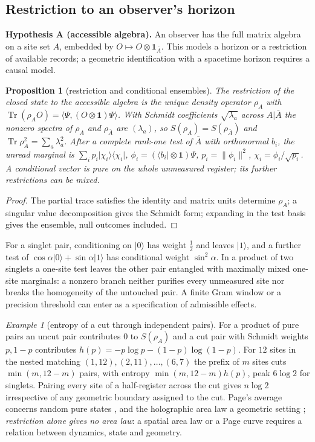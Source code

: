 \documentclass[aps,pra,onecolumn,superscriptaddress,nofootinbib,10pt]{revtex4-2}
\newtheorem{proposition}[theorem]{Proposition}
\theoremstyle{definition}
\theoremstyle{remark}
\newtheorem{example}[theorem]{Example}
\newcommand{\tr}{\operatorname{Tr}}
\newcommand{\ip}[2]{\langle #1,#2\rangle}
\begin{document}
\subsection{Restriction to an observer's horizon}\label{sec:cuhorizon}

\smallskip\noindent\textbf{Hypothesis A (accessible algebra).}\label{hyp:A}  An observer has the full matrix algebra on a site set $A$,
embedded by $O\mapsto O\otimes\mathbf1_{\bar A}$.  This models a horizon or a restriction of available records; a geometric
identification with a spacetime horizon requires a causal model.

\begin{proposition}[restriction and conditional ensembles]\label{prop:curestrict}
The restriction of the closed state to the accessible algebra is the unique density operator $\rho_A$ with
$\tr(\rho_AO)=\ip{\Psi}{(O\otimes\mathbf1)\Psi}$.  With Schmidt coefficients $\sqrt{\lambda_a}$ across $A\vert\bar A$ the nonzero spectra of $\rho_A$ and
$\rho_{\bar A}$ are $(\lambda_a)$, so $S(\rho_A)=S(\rho_{\bar A})$ and $\tr\rho_A^2=\sum_a\lambda_a^2$.  After a complete rank-one test of $\bar A$ with
orthonormal $b_i$, the unread marginal is $\sum_ip_i\lvert\chi_i\rangle\langle\chi_i\rvert$, $\phi_i=(\langle b_i\rvert\otimes\mathbf1)\Psi$, $p_i=\lVert\phi_i\rVert^2$, $\chi_i=\phi_i/\sqrt{p_i}$.  A
conditional vector is pure on the whole unmeasured register; its further restrictions can be mixed.
\end{proposition}
\begin{proof}
The partial trace satisfies the identity and matrix units determine $\rho_A$; a singular value decomposition
gives the Schmidt form; expanding in the test basis gives the ensemble, null outcomes included.
\end{proof}
\noindent For a singlet pair, conditioning on $\lvert0\rangle$ has weight $\tfrac12$ and leaves $\lvert1\rangle$, and a further test of
$\cos\alpha\lvert0\rangle+\sin\alpha\lvert1\rangle$ has conditional weight $\sin^2\alpha$.  In a product of two singlets a one-site test leaves the other pair
entangled with maximally mixed one-site marginals: a nonzero branch neither purifies every unmeasured
site nor breaks the homogeneity of the untouched pair.  A finite Gram window or a precision threshold
can enter as a specification of admissible effects.

\begin{example}[entropy of a cut through independent pairs]\label{ex:cupage}
For a product of pure pairs an uncut pair contributes $0$ to $S(\rho_A)$ and a cut pair with Schmidt weights $p,1-p$
contributes $h(p)=-p\log p-(1-p)\log(1-p)$.  For $12$ sites in the nested matching $(1,12),(2,11),\dots,(6,7)$ the prefix
of $m$ sites cuts $\min(m,12-m)$ pairs, with entropy $\min(m,12-m)h(p)$, peak $6\log2$ for singlets.  Pairing every site
of a half-register across the cut gives $n\log2$ irrespective of any geometric boundary assigned to the cut.
Page's average concerns random pure states \cite{n1-page}, and the holographic area law a geometric
setting \cite{n1-rt}; \emph{restriction alone gives no area law}: a spatial area law or a Page curve
requires a relation between dynamics, state and geometry.
\end{example}
\end{document}

